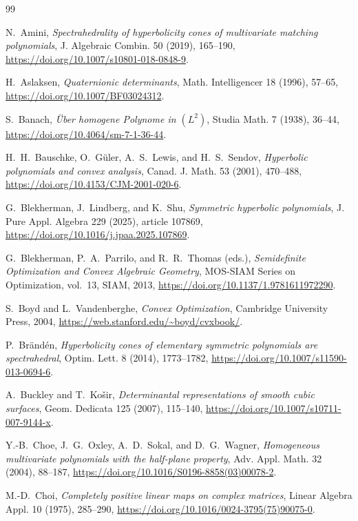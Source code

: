 \documentclass[11pt,onecolumn]{article}
\theoremstyle{blueplain}
\theoremstyle{bluedefinition}
\theoremstyle{bluedefinition}
\begin{document}
\begin{thebibliography}{99}

N.~Amini,
\emph{Spectrahedrality of hyperbolicity cones of multivariate matching polynomials},
J. Algebraic Combin. 50 (2019), 165--190,
\url{https://doi.org/10.1007/s10801-018-0848-9}.

H.~Aslaksen,
\emph{Quaternionic determinants},
Math. Intelligencer 18 (1996), 57--65,
\url{https://doi.org/10.1007/BF03024312}.

S.~Banach,
\emph{\"Uber homogene Polynome in $(L^2)$},
Studia Math. 7 (1938), 36--44,
\url{https://doi.org/10.4064/sm-7-1-36-44}.

H.~H.~Bauschke, O.~G\"uler, A.~S.~Lewis, and H.~S.~Sendov,
\emph{Hyperbolic polynomials and convex analysis},
Canad. J. Math. 53 (2001), 470--488,
\url{https://doi.org/10.4153/CJM-2001-020-6}.

G.~Blekherman, J.~Lindberg, and K.~Shu,
\emph{Symmetric hyperbolic polynomials},
J. Pure Appl. Algebra 229 (2025), article 107869,
\url{https://doi.org/10.1016/j.jpaa.2025.107869}.

G.~Blekherman, P.~A.~Parrilo, and R.~R.~Thomas (eds.),
\emph{Semidefinite Optimization and Convex Algebraic Geometry},
MOS-SIAM Series on Optimization, vol.~13,
SIAM, 2013,
\url{https://doi.org/10.1137/1.9781611972290}.

S.~Boyd and L.~Vandenberghe,
\emph{Convex Optimization},
Cambridge University Press, 2004,
\url{https://web.stanford.edu/~boyd/cvxbook/}.

P.~Br\"and\'en,
\emph{Hyperbolicity cones of elementary symmetric polynomials are spectrahedral},
Optim. Lett. 8 (2014), 1773--1782,
\url{https://doi.org/10.1007/s11590-013-0694-6}.

A.~Buckley and T.~Ko\v sir,
\emph{Determinantal representations of smooth cubic surfaces},
Geom. Dedicata 125 (2007), 115--140,
\url{https://doi.org/10.1007/s10711-007-9144-x}.

Y.-B.~Choe, J.~G.~Oxley, A.~D.~Sokal, and D.~G.~Wagner,
\emph{Homogeneous multivariate polynomials with the half-plane property},
Adv. Appl. Math. 32 (2004), 88--187,
\url{https://doi.org/10.1016/S0196-8858(03)00078-2}.

M.-D.~Choi,
\emph{Completely positive linear maps on complex matrices},
Linear Algebra Appl. 10 (1975), 285--290,
\url{https://doi.org/10.1016/0024-3795(75)90075-0}.


\end{thebibliography}
\end{document}

